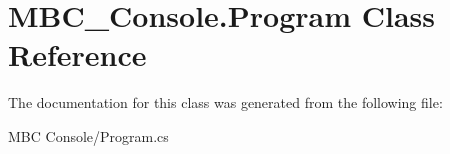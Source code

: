 \hypertarget{class_m_b_c___console_1_1_program}{\section{M\-B\-C\-\_\-\-Console.\-Program Class Reference}
\label{class_m_b_c___console_1_1_program}
}


The documentation for this class was generated from the following file\-:\begin{DoxyCompactItemize}
\item 
M\-B\-C Console/Program.\-cs\end{DoxyCompactItemize}
